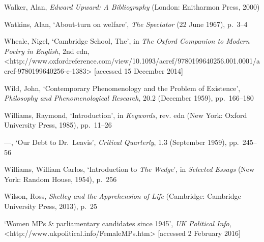 \documentclass[]{article}
\begin{document}
Walker, Alan, \emph{Edward Upward: A Bibliography} (London: Enitharmon
Press, 2000)

Watkins, Alan, `About-turn on welfare', \emph{The Spectator} (22 June
1967), p.~3--4

Wheale, Nigel, `Cambridge School, The', in \emph{The Oxford Companion to
Modern Poetry in English}, 2nd edn,\\
\textless{}http://www.oxfordreference.com/view/10.1093/acref/9780199640256.001.0001/acref-9780199640256-e-1383\textgreater{}
{[}accessed 15 December 2014{]}

Wild, John, `Contemporary Phenomenology and the Problem of Existence',
\emph{Philosophy and Phenomenological Research}, 20.2 (December 1959),
pp.~166--180

Williams, Raymond, `Introduction', in \emph{Keywords}, rev. edn (New
York: Oxford University Press, 1985), pp.~11--26

---, `Our Debt to Dr.~Leavis', \emph{Critical Quarterly}, 1.3 (September
1959), pp.~245--56

Williams, William Carlos, `Introduction to \emph{The Wedge}', in
\emph{Selected Essays} (New York: Random House, 1954), p.~256

Wilson, Ross, \emph{Shelley and the Apprehension of Life} (Cambridge:
Cambridge University Press, 2013), p.~25

`Women MPs \& parliamentary candidates since 1945', \emph{UK Political
Info},\\
\textless{}http://www.ukpolitical.info/FemaleMPs.htm\textgreater{}
{[}accessed 2 February 2016{]}
\end{document}
